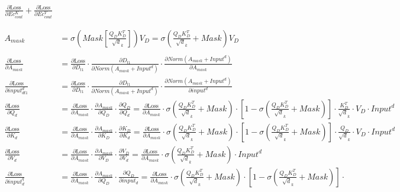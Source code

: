 \documentclass[12pt,letterpaper]{article}
\begin{document}
\begin{align*}
\frac{\partial \text{Loss}}{\partial Ec^K_{cout}}+
\frac{\partial \text{Loss}}{\partial Ec^V_{cout}}
\\\\ \\
A_{mask}&=\sigma(Mask[\frac{Q_{D} K_{D}^T}{\sqrt d_k}])V_{D}=\sigma( \frac{Q_{D} K_{D}^T}{\sqrt d_k}+Mask)V_{D}
\\\\
\frac{\partial \text{Loss}}{\partial A_{mask}} &= %
\frac{\partial \text{Loss}}{\partial D_{t1}}\cdot
\frac{\partial D_{t1}}{\partial Norm(A_{mask}+Input^d)}\cdot
\frac{\partial Norm(A_{mask}+Input^d)}{\partial A_{mask}}
\\
\frac{\partial \text{Loss}}{\partial input^d_{dt1}} &= %
\frac{\partial \text{Loss}}{\partial D_{t1}}\cdot
\frac{\partial D_{t1}}{\partial Norm(A_{mask}+Input^d)}\cdot
\frac{\partial Norm(A_{mask}+Input^d)}{\partial input^d}
\\
\frac{\partial \text{Loss}}{\partial Q_{d}} &= %
\frac{\partial \text{Loss}}{\partial A_{mask}}\cdot
\frac{\partial A_{mask}}{\partial Q_{D}} \cdot
\frac{\partial Q_{D}}{\partial Q_{d}}=
\frac{\partial \text{Loss}}{\partial A_{mask}} \cdot 
\sigma( \frac{Q_{D} K_{D}^T}{\sqrt d_k}+Mask)\cdot \left[1-\sigma( \frac{Q_{D} K_{D}^T}{\sqrt d_k}+Mask)\right]\cdot 
\frac{ K_{D}^T}{\sqrt d_k} \cdot V_{D} \cdot Input^d
\\
\frac{\partial \text{Loss}}{\partial K_{d}} &= %
\frac{\partial \text{Loss}}{\partial A_{mask}}\cdot
\frac{\partial A_{mask}}{\partial K_{D}} \cdot
\frac{\partial K_{D}}{\partial K_{d}}=
\frac{\partial \text{Loss}}{\partial A_{mask}} \cdot 
\sigma( \frac{Q_{D} K_{D}^T}{\sqrt d_k}+Mask)\cdot \left[1-\sigma( \frac{Q_{D} K_{D}^T}{\sqrt d_k}+Mask)\right]\cdot 
\frac{ Q_{D}}{\sqrt d_k} \cdot V_{D} \cdot Input^d
\\
\frac{\partial \text{Loss}}{\partial V_{d}} &= %
\frac{\partial \text{Loss}}{\partial A_{mask}}\cdot
\frac{\partial A_{mask}}{\partial V_{D}} \cdot
\frac{\partial V_{D}}{\partial V_{d}}=
\frac{\partial \text{Loss}}{\partial A_{mask}} \cdot 
\sigma( \frac{Q_{D} K_{D}^T}{\sqrt d_k}+Mask)\cdot Input^d
\\
\frac{\partial \text{Loss}}{\partial input^q_d} &= %
\frac{\partial \text{Loss}}{\partial A_{mask}}\cdot
\frac{\partial A_{mask}}{\partial Q_{D}} \cdot
\frac{\partial Q_{D}}{\partial input_d}=
\frac{\partial \text{Loss}}{\partial A_{mask}} \cdot 
\sigma( \frac{Q_{D} K_{D}^T}{\sqrt d_k}+Mask)\cdot \left[1-\sigma( \frac{Q_{D} K_{D}^T}{\sqrt d_k}+Mask)\right]\cdot 

\end{align*}
\end{document}
